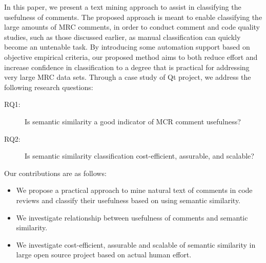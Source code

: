 



In this paper, we present a text mining approach to assist in classifying the usefulness of comments.
The proposed approach is meant to enable classifying the large amounts of MRC comments, in order to conduct comment and code quality studies, such as those discussed earlier, as manual classification can quickly become an untenable task.
By introducing some automation support based on objective empirical criteria,
our proposed method aims to both reduce effort and increase confidence in classification to a degree that is practical for addressing very large MRC data sets.
Through a case study of Qt project, we address the following research questions:
\begin{description}
\item[RQ1:] Is semantic similarity a good indicator of MCR comment usefulness?\\
\item[RQ2:] Is semantic similarity classification cost-efficient, assurable, and scalable?
\end{description}

Our contributions are as follows:
\begin{itemize}
\item We propose a practical approach to mine natural text of comments in code reviews and classify their usefulness based on using semantic similarity.
\item We investigate relationship between usefulness of comments and semantic similarity.
\item We investigate cost-efficient, assurable and scalable of semantic similarity in large open source project based on actual human effort.
\end{itemize}

